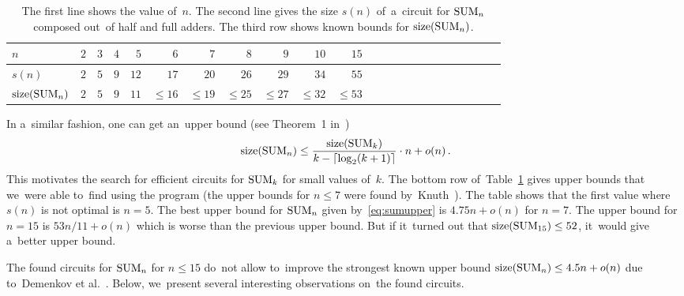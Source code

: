 \begin{table}
\begin{center}
\begin{tabular}{lrrrrrrrrrrrrrrrrrrrrrr}
\toprule
$n$ & $2$ & $3$ & $4$ & $5$ & $6$ & $7$ & $8$ & $9$ & $10$ & $15$
\\
\midrule
$s(n)$ &$2$ & $5$ & $9$ & $12$ & $17$ & $20$ & $26$ & $29$& $34$&
$55$
\\
$\operatorname{size}(\operatorname{SUM}_n)$ & $2$ & $5$ & $9$ & $11$
& $\le 16$ & $\le 19$ & $\le 25$ & $\le 27$
& $\le 32$ & $\le 53$
\\
\bottomrule
\end{tabular}
\end{center}
\caption{The first line shows the value of~$n$. The second line gives the size $s(n)$ of~a~circuit for $\operatorname{SUM}_n$
composed out~of half and full adders. The third row shows known bounds for $\operatorname{size}(\operatorname{SUM}_n)$.}
\label{table:sum}
\end{table}

In a~similar fashion, one can get an~upper bound (see Theorem~1 in~\cite{DBLP:conf/date/Kulikov18})
\begin{equation}\label{eq:sumupper}
\operatorname{size}(\operatorname{SUM}_n) \le \frac{\operatorname{size}(\operatorname{SUM}_k)}{k-\lceil \log_2(k+1) \rceil} \cdot n + o(n) \, .
\end{equation}
This motivates the search for efficient circuits
for $\operatorname{SUM}_k$ for small values of~$k$. The bottom row
of~Table~\ref{table:sum} gives upper bounds that
we~were able to~find using the program
(the upper bounds for $n \le 7$ were found
by~Knuth~\cite{Knuth:2008:ACP:1377542}).
The table shows that the first value where $s(n)$ is not
optimal is $n=5$. The best upper bound for $\operatorname{SUM}_n$ given
by~\eqref{eq:sumupper} is $4.75n+o(n)$ for $n=7$. The upper
bound for $n=15$ is $53n/11+o(n)$ which is worse than the
previous upper bound. But if it~turned out that
$\operatorname{size}(\operatorname{SUM}_{15}) \le 52$,
it~would give a~better upper bound.

The found circuits for $\operatorname{SUM}_n$ for $n \le 15$
do~not allow to~improve the strongest known upper bound
$\operatorname{size}(\operatorname{SUM}_n) \le 4.5n+o(n)$ due to~Demenkov et al.~\cite{DBLP:journals/ipl/DemenkovKKY10}. Below,
we~present several interesting observations on~the found circuits.

